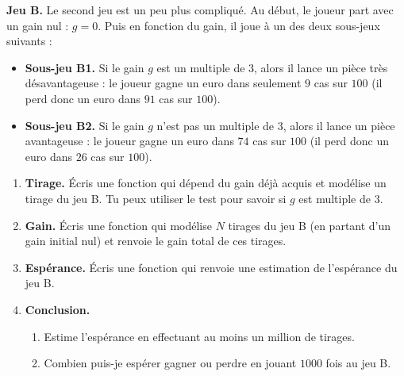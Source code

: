 \documentclass[11pt,class=report,crop=false]{standalone}
\begin{document}


\begin{activite}


\textbf{Jeu B.} Le second jeu est un peu plus compliqué. Au début, le joueur part avec un gain nul : $g=0$. Puis en fonction du gain, il joue à un des deux sous-jeux suivants :
\begin{itemize}
  \item \textbf{Sous-jeu B1.} Si le gain $g$ est un multiple de $3$, alors il lance un pièce très désavantageuse : le joueur gagne un euro dans seulement $9$ cas sur $100$ (il perd donc un euro dans $91$ cas sur $100$).
  
  \item \textbf{Sous-jeu B2.} Si le gain $g$ n'est pas un multiple de $3$, alors il lance un pièce avantageuse : le joueur gagne un euro dans $74$ cas sur $100$ (il perd donc un euro dans $26$ cas sur $100$).
\end{itemize}

\begin{enumerate}
  \item \textbf{Tirage.}
  \'Ecris une fonction  qui dépend du gain déjà acquis et modélise un tirage du jeu B. Tu peux utiliser le test  pour savoir si $g$ est multiple de $3$.
  
  \item \textbf{Gain.} \'Ecris une fonction  qui modélise $N$ tirages du jeu B (en partant d'un gain initial nul) et renvoie le gain total de ces tirages.
  
 
  
  \item \textbf{Espérance.} \'Ecris une fonction  qui renvoie une estimation de l'espérance du jeu B.
  
  \item \textbf{Conclusion.}
  \begin{enumerate}
    \item Estime l'espérance en effectuant au moins un million de tirages.
    \item Combien puis-je espérer gagner ou perdre en jouant $1000$ fois au jeu B.
  \end{enumerate}

\end{enumerate}

\end{activite}
\end{document}
